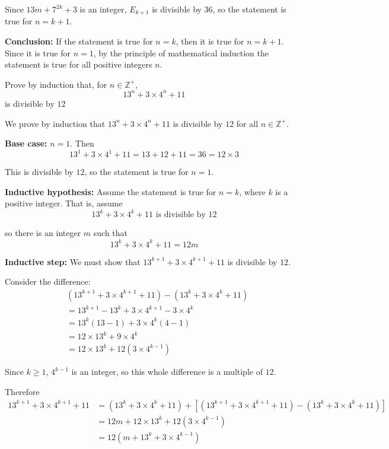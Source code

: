 \documentclass[leqno]{article}
\begin{document}
\begin{enumerate}[
  label=\textbf{\arabic*.},
  leftmargin=*,
  topsep=0pt,
  partopsep=0pt,
  parsep=0pt
]
\begin{djsSolution}
Since \(13m+7^{2k}+3\) is an integer, \(E_{k+1}\) is divisible by \(36\), so the statement is true for \(n=k+1\).

\textbf{Conclusion:} If the statement is true for \(n=k\), then it is true for \(n=k+1\). Since it is true for \(n=1\), by the principle of mathematical induction the statement is true for all positive integers \(n\).
\end{djsSolution}


\newpage

\questionitem

Prove by induction that, for $n \in \mathbb{Z}^+$,
\[13^n+3\times 4^n+11\] is divisible by $12$ 

\vspace*{10pt}

\begin{djsSolution}
We prove by induction that \(13^n+3\times 4^n+11\) is divisible by \(12\) for all \(n\in\mathbb{Z}^+\).

\textbf{Base case:} \(n=1\). Then
\[
13^1+3\times 4^1+11=13+12+11=36=12\times 3
\]

This is divisible by \(12\), so the statement is true for \(n=1\).

\textbf{Inductive hypothesis:} Assume the statement is true for \(n=k\), where \(k\) is a positive integer. That is, assume
\[
13^k+3\times 4^k+11 \text{ is divisible by } 12
\]

so there is an integer \(m\) such that
\[
13^k+3\times 4^k+11=12m
\]

\textbf{Inductive step:} We must show that \(13^{k+1}+3\times 4^{k+1}+11\) is divisible by \(12\).

Consider the difference:
\begin{align*}
&\left(13^{k+1}+3\times 4^{k+1}+11\right)-\left(13^k+3\times 4^k+11\right) \\
&= 13^{k+1}-13^k+3\times 4^{k+1}-3\times 4^k \\
&= 13^k(13-1)+3\times 4^k(4-1) \\
&= 12\times 13^k+9\times 4^k \\
&= 12\times 13^k+12\left(3\times 4^{k-1}\right)
\end{align*}

Since \(k\geq 1\), \(4^{k-1}\) is an integer, so this whole difference is a multiple of \(12\).

Therefore
\begin{align*}
13^{k+1}+3\times 4^{k+1}+11
&= \left(13^k+3\times 4^k+11\right)
 + \left[\left(13^{k+1}+3\times 4^{k+1}+11\right)-\left(13^k+3\times 4^k+11\right)\right] \\
&= 12m + 12\times 13^k + 12\left(3\times 4^{k-1}\right) \\
&= 12\left(m+13^k+3\times 4^{k-1}\right)
\end{align*}


\end{djsSolution}
\end{enumerate}
\end{document}
